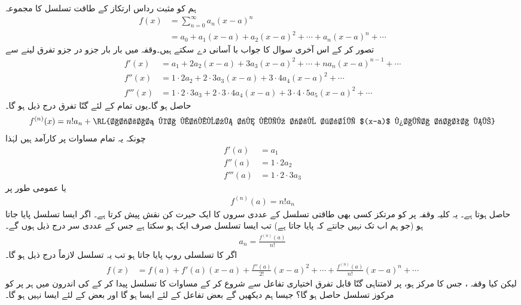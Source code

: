 ہم   کو مثبت رداس ارتکاز کے طاقت تسلسل کا مجموعہ 
\begin{align*}
f(x)&=\sum_{n=0}^{\infty}a_n(x-a)^n\\
&=a_0+a_1(x-a)+a_2(x-a)^2+\cdots+a_n(x-a)^n+\cdots
\end{align*}
تصور کر کے اس آخری سوال کا جواب با آسانی دے سکتے ہیں۔وقفہ  میں  بار بار جزو در جزو تفرق لینے سے 
\begin{align*}
f'(x)&=a_1+2a_2(x-a)+3a_3(x-a)^2+\cdots+na_n(x-a)^{n-1}+\cdots\\
f''(x)&=1\cdot 2a_2+2\cdot 3a_3(x-a)+3\cdot 4a_4(x-a)^2+\cdots\\
f'''(x)&=1\cdot2\cdot3a_3+2\cdot3\cdot4a_4(x-a)+3\cdot4\cdot5a_5(x-a)^2+\cdots
\end{align*}
حاصل ہو گا۔یوں تمام  کے لئے  گنّا تفرق درج ذیل ہو گا۔
\begin{align*}
f^{(n)}(x)=n!a_n+\text{\RL{اجزاء کا مجموعہ جن میں جزو ضربی $(x-a)$ پایا جاتا ہے}}
\end{align*}
چونکہ یہ تمام مساوات  پر کارآمد ہیں لہٰذا 
\begin{align*}
f'(a)&=a_1\\
f''(a)&=1\cdot 2 a_2\\
f'''(a)&=1\cdot 2\cdot 3a_3
\end{align*}
یا عمومی طور پر
\begin{align*}
f^{(n)}(a)=n!a_n
\end{align*}
حاصل ہوتا ہے۔ یہ کلیہ وقفہ  پر  کو مرتکز کسی بھی طاقتی تسلسل  کے عددی سروں کا ایک حیرت کن نقش پیش کرتا ہے۔ اگر ایسا تسلسل پایا جاتا ہو (جو ہم اب تک نہیں جانتے کہ پایا جاتا ہے) تب ایسا تسلسل صرف ایک ہو سکتا ہے جس کے  عددی سر درج ذیل ہوں گے۔
\begin{align*}
a_n=\frac{f^{(n)}(a)}{n!}
\end{align*}
اگر  کا تسلسلی روپ پایا جاتا ہو تب یہ تسلسل لازماً درج ذیل ہو گا۔
\begin{align}\label{مساوات_تسلسل_عمومی_تسلسل}
f(x)&=f(a)+f'(a)(x-a)+\frac{f''(a)}{2!}(x-a)^2+\cdots+\frac{f^{(n)}(a)}{n!}(x-a)^n+\cdots
\end{align}
لیکن کیا وقفہ ، جس کا مرکز  ہو، پر  لامتناہی گنّا قابل تفرق اختیاری تفاعل  سے شروع کر کے مساوات  کا تسلسل پیدا کر کے  کی اندرون میں ہر  پر  کو مرکوز تسلسل حاصل ہو گا؟ جیسا ہم دیکھیں گے  بعض تفاعل کے لئے ایسا ہو گا اور بعض کے لئے ایسا نہیں ہو گا۔

